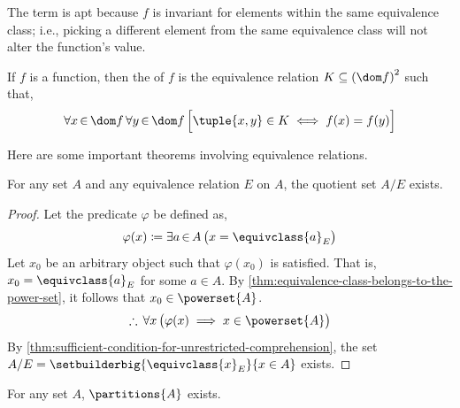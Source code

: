 \begin{rem}
    The term  is apt because \( f \) is invariant for elements within the same
    equivalence class; i.e., picking a different element from the same equivalence class will not alter the
    function's value.
\end{rem}

\begin{dfn}
    \label{dfn:equivalence-kernel-of-a-function}
    If \( f \) is a function, then the  of \( f \) is the equivalence relation
    \( K \subseteq \mleft( \dom f \mright)^{2} \) such that,
    \begin{equation*}
        \forall x\,{\in}\,\dom f \, \forall y\,{\in}\,\dom f \, \Big[ \tuple{x,y} \in K \iff f(x) = f(y) \Big]
    \end{equation*}
\end{dfn}
\noindent
Here are some important theorems involving equivalence relations.

\begin{thm}
    \label{thm:existence-of-the-quotient-set}
    For any set \( A \) and any equivalence relation \( E \) on \( A \), the quotient set \( A/E \) exists.
\end{thm}

\begin{proof}
    Let the predicate \( \varphi \) be defined as,
    \begin{equation*}
        \varphi(x) \coloneq \exists a\,{\in}\,A \, \big( x = \equivclass{a}_{E} \big)
    \end{equation*}
    Let \( x_{0} \) be an arbitrary object such that \( \varphi(x_{0}) \) is satisfied. That is,
    \( x_{0} = \equivclass{a}_{E} \) for some \( a \in A \).
    By \cref{thm:equivalence-class-belongs-to-the-power-set}, it follows that \( x_{0} \in \powerset{A} \).
    \begin{equation*}
        \therefore \, \forall x \, \big( \varphi(x) \implies x \in \powerset{A} \big)
    \end{equation*}
    By \cref{thm:sufficient-condition-for-unrestricted-comprehension}, the set
    \( A / E = \setbuilderbig{\equivclass{x}_{E}}{x \in A} \) exists.
\end{proof}

\begin{thm}
    \label{thm:existence-of-the-set-of-all-partitions}
    For any set \( A \), \( \partitions{A} \) exists.
\end{thm}

